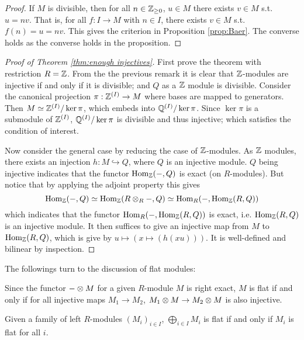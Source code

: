 \documentclass{article}
\begin{document}
\begin{proof}
    If $M$ is divisible, then for all $n\in \mathbb{Z}_{\geq 0}$, $u\in M$ there exists $v \in M$ s.t. $u = nv$. That is, for all $f: I \to M$ with $n \in I$, there exists $v \in M$ s.t. $f(n) = u = nv$. This gives the criterion in Proposition \ref{prop:Baer}. The converse holds as the converse holds in the proposition.
\end{proof}

\begin{proof}[Proof of Theorem \ref{thm:enough injectives}]
    First prove the theorem with restriction $R = \mathbb{Z}$. From the the previous remark it is clear that $\mathbb{Z}$-modules are injective if and only if it is divisible; and $Q$ as a $\mathbb{Z}$ module is divisible. Consider the canonical projection $\pi: \mathbb{Z}^{(I)} \to M$ where bases are mapped to generators. Then $M \simeq \mathbb{Z}^{(I)}/\ker \pi$, which embeds into $\mathbb{Q}^{(I)}/\ker \pi$. Since $\ker\pi$ is a submodule of $\mathbb{Z}^{(I)}$, $\mathbb{Q}^{(I)}/\ker \pi$ is divisible and thus injective; which satisfies the condition of interest.

    Now consider the general case by reducing the case of $\mathbb{Z}$-modules. As $\mathbb{Z}$ modules, there exists an injection $h: M \hookrightarrow Q$, where $Q$ is an injective module. $Q$ being injective indicates that the functor $\mathrm{Hom}_{\mathbb{Z}}(-, Q)$ is exact (on $R$-modules). But notice that by applying the adjoint property this gives
    \[
        \mathrm{Hom}_{\mathbb{Z}}(-, Q) \simeq \mathrm{Hom}_{\mathbb{Z}}(R \otimes_R -, Q) \simeq \mathrm{Hom}_{R}(-, \mathrm{Hom}_{\mathbb{Z}}(R, Q))
    \] 
    which indicates that the functor $\mathrm{Hom}_{R}(-, \mathrm{Hom}_{\mathbb{Z}}(R, Q))$ is exact, i.e. $\mathrm{Hom}_{\mathbb{Z}}(R, Q)$ is an injective module. It then suffices to give an injective map from $M$ to $\mathrm{Hom}_{\mathbb{Z}}(R, Q)$, which is give by $u \mapsto (x \mapsto (h(xu)))$. It is well-defined and bilinear by inspection.
\end{proof}

The followings turn to the discussion of flat modules:

\begin{remark}
    Since the functor $- \otimes M$ for a given $R$-module $M$ is right exact, $M$ is flat if and only if for all injective maps $M_1 \to M_2$, $M_1 \otimes M \to M_2 \otimes M$ is also injective. 
\end{remark}

\begin{proposition}
    Given a family of left $R$-modules $(M_i)_{i \in I}$, $\bigoplus_{i\in I} M_i$ is flat if and only if $M_i$ is flat for all $i$.
\end{proposition}
\end{document}
